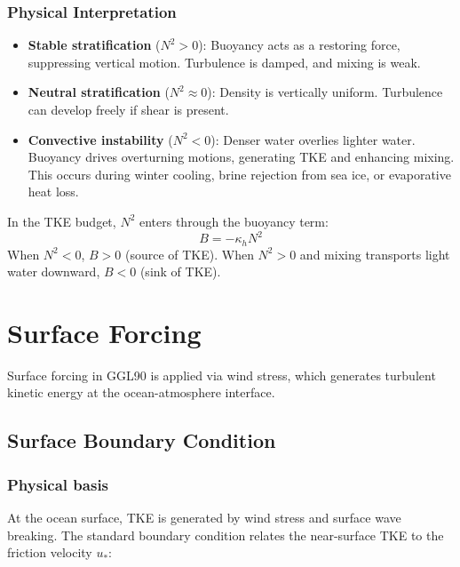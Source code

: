 \documentclass[12pt,letterpaper]{article}
\begin{document}
\subsubsection{Physical Interpretation}

\begin{itemize}[leftmargin=*]
  \item \textbf{Stable stratification} ($N^2 > 0$): Buoyancy acts as a
        restoring force, suppressing vertical motion. Turbulence is damped,
        and mixing is weak.

  \item \textbf{Neutral stratification} ($N^2 \approx 0$): Density is
        vertically uniform. Turbulence can develop freely if shear is present.

  \item \textbf{Convective instability} ($N^2 < 0$): Denser water overlies
        lighter water. Buoyancy drives overturning motions, generating TKE and
        enhancing mixing. This occurs during winter cooling, brine rejection
        from sea ice, or evaporative heat loss.
\end{itemize}

In the TKE budget, $N^2$ enters through the buoyancy term:
\[
B = -\kappa_h N^2
\]
When $N^2 < 0$, $B > 0$ (source of TKE). When $N^2 > 0$ and mixing transports
light water downward, $B < 0$ (sink of TKE).

\section{Surface Forcing}
\label{sec:surface_forcing}

Surface forcing in GGL90 is applied via wind stress, which generates turbulent kinetic energy at the ocean-atmosphere interface.

\subsection{Surface Boundary Condition}
\label{sec:bc_surface}

\subsubsection{Physical basis}

At the ocean surface, TKE is generated by wind stress and surface wave breaking. The standard boundary condition relates the near-surface TKE to the friction velocity $u_*$:
\end{document}

